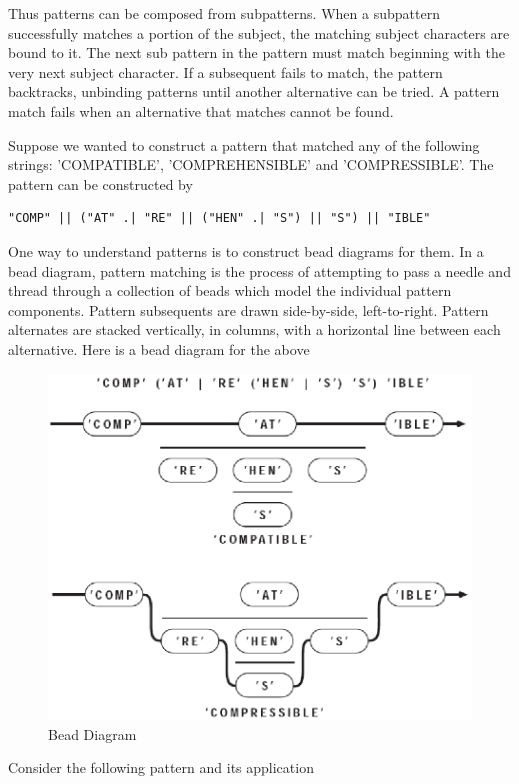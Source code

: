 \documentclass[letterpaper,12pt]{article}
\begin{document}
Thus patterns can be composed from subpatterns. When a subpattern
successfully matches a portion of the subject, the matching subject
characters are bound to it. The next sub pattern in the pattern must
match beginning with the very next subject character. If a subsequent
fails to match, the pattern backtracks, unbinding patterns until
another alternative can be tried. A pattern match fails when an
alternative that matches cannot be found.

Suppose we wanted to construct a pattern that matched any of the
following strings: 'COMPATIBLE', 'COMPREHENSIBLE' and
'COMPRESSIBLE'. The pattern can be constructed by

\begin{verbatim}
"COMP" || ("AT" .| "RE" || ("HEN" .| "S") || "S") || "IBLE"
\end{verbatim}

One way to understand patterns is to construct bead diagrams for
them. In a bead diagram, pattern matching is the process of attempting
to pass a needle and thread through a collection of beads which model
the individual pattern components. Pattern subsequents are drawn
side-by-side, left-to-right. Pattern alternates are stacked
vertically, in columns, with a horizontal line between each
alternative.  Here is a bead diagram for the above
\begin{figure}[h]
\centering
\includegraphics[width=\linewidth]{beaddia.png}
\caption{Bead Diagram}
\end{figure}

Consider the following pattern and its application
\end{document}
